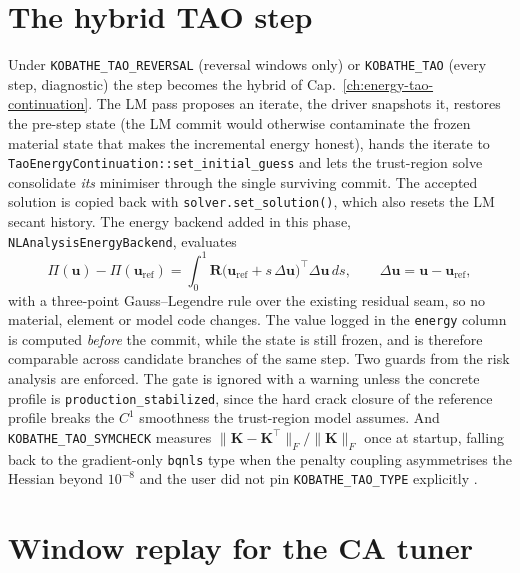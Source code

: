 \section{The hybrid TAO step}
\label{sec:drv-tao}

Under \texttt{KOBATHE\_TAO\_REVERSAL} (reversal windows only) or
\texttt{KOBATHE\_TAO} (every step, diagnostic) the step becomes the
hybrid of Cap.~\ref{ch:energy-tao-continuation}. The LM pass proposes an
iterate, the driver snapshots it, restores the pre-step state (the LM
commit would otherwise contaminate the frozen material state that makes
the incremental energy honest), hands the iterate to
\texttt{TaoEnergyContinuation::set\_initial\_guess} and lets the
trust-region solve consolidate \emph{its} minimiser through the single
surviving commit. The accepted solution is copied back with
\texttt{solver.set\_solution()}, which also resets the LM secant history.
The energy backend added in this phase,
\texttt{NLAnalysisEnergyBackend}, evaluates
\[
  \Pi(\mathbf u)-\Pi(\mathbf u_{\mathrm{ref}})
  = \int_0^1 \mathbf R\bigl(\mathbf u_{\mathrm{ref}} + s\,\Delta\mathbf u\bigr)^{\!\top}
    \Delta\mathbf u \, ds ,
  \qquad \Delta\mathbf u = \mathbf u - \mathbf u_{\mathrm{ref}},
\]
with a three-point Gauss--Legendre rule over the existing residual seam,
so no material, element or model code changes. The value logged in the
\texttt{energy} column is computed \emph{before} the commit, while the
state is still frozen, and is therefore comparable across candidate
branches of the same step. Two guards from the risk analysis are
enforced. The gate is ignored with a warning unless the concrete profile
is \texttt{production\_stabilized}, since the hard crack closure of the
reference profile breaks the $C^1$ smoothness the trust-region model
assumes. And \texttt{KOBATHE\_TAO\_SYMCHECK} measures
$\lVert\mathbf K-\mathbf K^{\top}\rVert_F/\lVert\mathbf K\rVert_F$ once at
startup, falling back to the gradient-only \texttt{bqnls} type when the
penalty coupling asymmetrises the Hessian beyond $10^{-8}$ and the user
did not pin \texttt{KOBATHE\_TAO\_TYPE} explicitly
\cite{BalayPETScManual}.

\section{Window replay for the CA tuner}
\label{sec:drv-replay}

